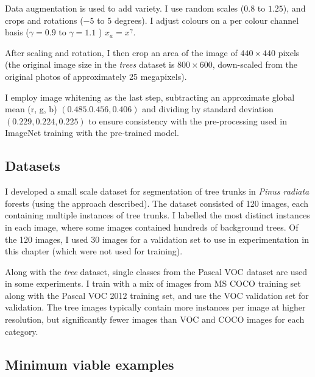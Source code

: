 Data augmentation is used to add variety. I use random scales ($0.8$ to $1.25$), and crops and rotations ($-5$ to $5$ degrees). I adjust colours on a per colour channel basis ($ \gamma = 0.9 $ to $ \gamma=1.1 $ )  $ x_a = x^{\gamma} $.

After scaling and rotation, I then crop an area of the image of $440 \times 440$ pixels (the original image size in the \emph{trees} dataset is $800 \times 600$, down-scaled from the original photos of approximately 25 megapixels).

I employ image whitening as the last step, subtracting an approximate global mean (r, g, b) $ (0.485. 0.456, 0.406) $ and dividing by standard deviation $ (0.229, 0.224, 0.225) $  to ensure consistency with the pre-processing used in ImageNet training with the pre-trained model.



\subsection {Datasets}




I developed a small scale dataset for segmentation of tree trunks in \emph{Pinus radiata} forests (using the approach described). The dataset consisted of 120 images, each containing multiple instances of tree trunks. I labelled the most distinct instances in each image, where some images contained hundreds of background trees. Of the 120 images, I used 30 images for a validation set to use in experimentation in this chapter (which were not used for training).

Along with the \emph{tree} dataset, single classes from the Pascal VOC dataset are used in some experiments. I train with a mix of images from MS COCO \cite{Lin2014} training set along with the Pascal VOC 2012 training set, and use the VOC validation set for validation. The tree images typically contain more instances per image at higher resolution, but significantly fewer images than VOC and COCO images for each category.


\subsection {Minimum viable examples}

